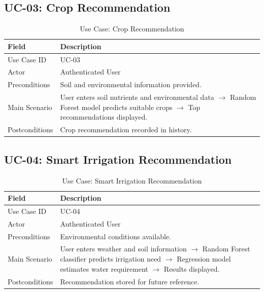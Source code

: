 \subsection{UC-03: Crop Recommendation}

\begin{table}[H]
\centering
\caption{Use Case: Crop Recommendation}
\renewcommand{\arraystretch}{1.4}
\begin{tabularx}{\textwidth}{l X}
\toprule
\textbf{Field} & \textbf{Description}\\
\midrule
Use Case ID & UC-03\\
Actor & Authenticated User\\
Preconditions & Soil and environmental information provided.\\
Main Scenario &
User enters soil nutrients and environmental data $\rightarrow$
Random Forest model predicts suitable crops $\rightarrow$
Top recommendations displayed.\\
Postconditions &
Crop recommendation recorded in history.\\
\bottomrule
\end{tabularx}
\end{table}

\subsection{UC-04: Smart Irrigation Recommendation}

\begin{table}[H]
\centering
\caption{Use Case: Smart Irrigation Recommendation}
\renewcommand{\arraystretch}{1.4}
\begin{tabularx}{\textwidth}{l X}
\toprule
\textbf{Field} & \textbf{Description}\\
\midrule
Use Case ID & UC-04\\
Actor & Authenticated User\\
Preconditions & Environmental conditions available.\\
Main Scenario &
User enters weather and soil information $\rightarrow$
Random Forest classifier predicts irrigation need $\rightarrow$
Regression model estimates water requirement $\rightarrow$
Results displayed.\\
Postconditions &
Recommendation stored for future reference.\\
\bottomrule
\end{tabularx}
\end{table}

